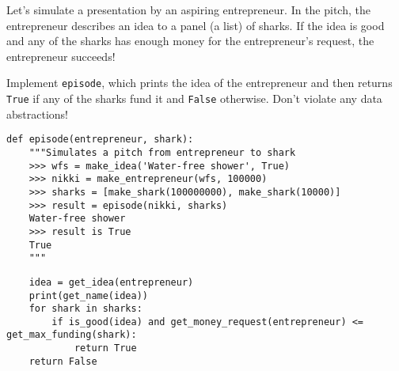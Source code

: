 \question 
Let’s simulate a presentation by an aspiring entrepreneur.
In the pitch, the entrepreneur describes an idea 
to a panel (a list) of sharks.
If the idea is good
and any of the sharks has enough money for
the entrepreneur's request, the entrepreneur
succeeds!

Implement {\tt episode}, which prints the idea of the entrepreneur 
and then returns {\tt True} if any of the sharks fund it and {\tt False} otherwise.
Don't violate any data abstractions!

\begin{minipage}{\textwidth}
\begin{lstlisting}
def episode(entrepreneur, shark):
    """Simulates a pitch from entrepreneur to shark
    >>> wfs = make_idea('Water-free shower', True)
    >>> nikki = make_entrepreneur(wfs, 100000)
    >>> sharks = [make_shark(100000000), make_shark(10000)]
    >>> result = episode(nikki, sharks)
    Water-free shower
    >>> result is True
    True
    """
\end{lstlisting}
\begin{solution}[2in]
\begin{lstlisting}
    idea = get_idea(entrepreneur)
    print(get_name(idea))
    for shark in sharks:
        if is_good(idea) and get_money_request(entrepreneur) <= get_max_funding(shark):
            return True
    return False
\end{lstlisting}
\end{solution}
\end{minipage}
